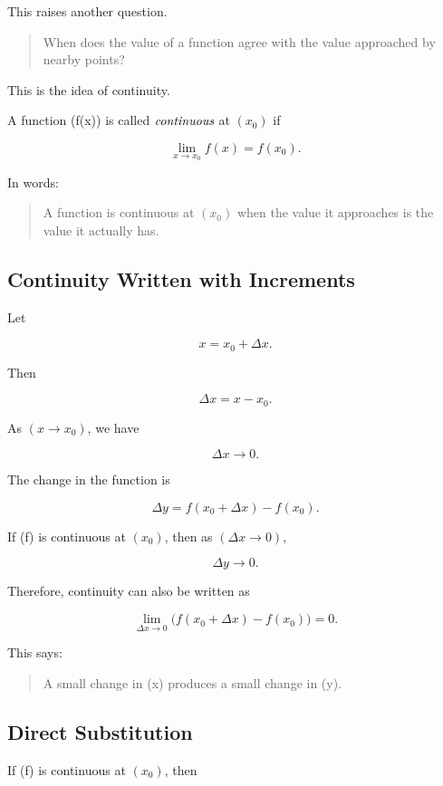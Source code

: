 This raises another question.

\begin{quote}
When does the value of a function agree with the value approached by nearby points?
\end{quote}

This is the idea of continuity.

\begin{definition}
A function (f(x)) is called $\emph{continuous}$ at $(x_0)$ if

\[
\lim_{x\to x_0}f(x)=f(x_0).
\]
\end{definition}

In words:

\begin{quote}
A function is continuous at $(x_0)$ when the value it approaches is the value it actually has.
\end{quote}

\subsection{Continuity Written with Increments}

Let

\[
x=x_0+\Delta x.
\]

Then

\[
\Delta x=x-x_0.
\]

As $(x\to x_0)$, we have

\[
\Delta x\to 0.
\]

The change in the function is

\[
\Delta y=f(x_0+\Delta x)-f(x_0).
\]

If (f) is continuous at $(x_0)$, then as $(\Delta x\to 0)$,

\[
\Delta y\to 0.
\]

Therefore, continuity can also be written as

\[
\lim_{\Delta x\to 0} \bigl(f(x_0+\Delta x)-f(x_0)\bigr) = 0.
\]

This says:

\begin{quote}
A small change in (x) produces a small change in (y).
\end{quote}

\subsection{Direct Substitution}

If (f) is continuous at $(x_0)$, then

